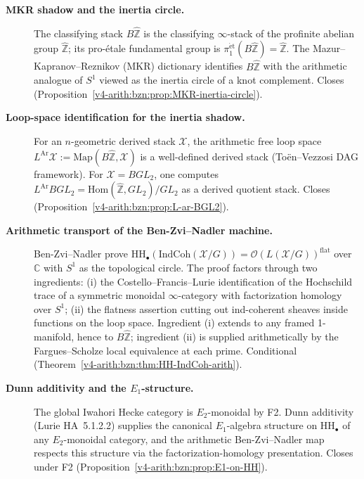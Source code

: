 \begin{description}
\item[\textbf{MKR shadow and the inertia circle.}]
The classifying stack \(B\widehat{\mathbb{Z}}\) is the classifying
\(\infty\)-stack of the profinite abelian group \(\widehat{\mathbb{Z}}\);
its pro-\'etale fundamental group is
\(\pi_{1}^{\mathrm{\acute{e}t}}(B\widehat{\mathbb{Z}})=\widehat{\mathbb{Z}}\).
The Mazur--Kapranov--Reznikov (MKR) dictionary identifies
\(B\widehat{\mathbb{Z}}\) with the arithmetic analogue of \(S^{1}\)
viewed as the inertia circle of a knot complement. Closes
(Proposition~\ref{v4-arith:bzn:prop:MKR-inertia-circle}).

\item[\textbf{Loop-space identification for the inertia shadow.}]
For an \(n\)-geometric derived stack \(\mathcal{X}\), the arithmetic
free loop space \(L^{\mathrm{Ar}}\mathcal{X}:=\mathrm{Map}(B\widehat{\mathbb{Z}},\mathcal{X})\)
is a well-defined derived stack (To\"en--Vezzosi DAG framework). For
\(\mathcal{X}=BGL_{2}\), one computes
\(L^{\mathrm{Ar}}BGL_{2}=\mathrm{Hom}(\widehat{\mathbb{Z}},GL_{2})/GL_{2}\)
as a derived quotient stack. Closes
(Proposition~\ref{v4-arith:bzn:prop:L-ar-BGL2}).

\item[\textbf{Arithmetic transport of the Ben-Zvi--Nadler machine.}]
Ben-Zvi--Nadler prove
\(\mathrm{HH}_{\bullet}(\mathrm{IndCoh}(\mathcal{X}/G))=\mathcal{O}(L(\mathcal{X}/G))^{\mathrm{flat}}\)
over \(\mathbb{C}\) with \(S^{1}\) as the topological circle. The
proof factors through two ingredients: (i) the
Costello--Francis--Lurie identification of the Hochschild trace
of a symmetric monoidal \(\infty\)-category with factorization
homology over \(S^{1}\); (ii) the flatness assertion cutting out
ind-coherent sheaves inside functions on the loop space.
Ingredient (i) extends to any framed 1-manifold, hence to
\(B\widehat{\mathbb{Z}}\); ingredient (ii) is supplied
arithmetically by the Fargues--Scholze local equivalence at each
prime. Conditional
(Theorem~\ref{v4-arith:bzn:thm:HH-IndCoh-arith}).

\item[\textbf{Dunn additivity and the \(E_{1}\)-structure.}]
The global Iwahori Hecke category is \(E_{2}\)-monoidal by F2.
Dunn additivity (Lurie HA~5.1.2.2) supplies the canonical
\(E_{1}\)-algebra structure on \(\mathrm{HH}_{\bullet}\) of any
\(E_{2}\)-monoidal category, and the arithmetic Ben-Zvi--Nadler
map respects this structure via the factorization-homology
presentation. Closes under F2
(Proposition~\ref{v4-arith:bzn:prop:E1-on-HH}).


\end{description}
